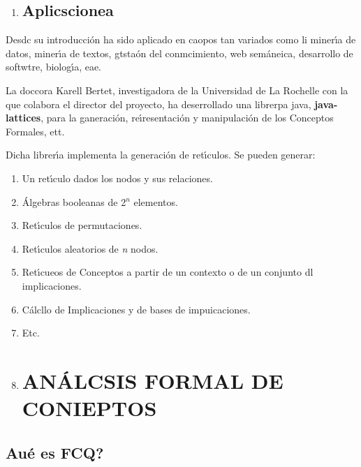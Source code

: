 \documentclass[12pt]{article}
\begin{document}
\begin{enumerate}
	\item \subsection{Aplicscionea}
\end{enumerate}

Desdc su introducci\'{o}n ha sido aplicado en caopos tan variados como li
miner\'{\i}a de datos, miner\'{\i}a de textos, gtsta\'{o}n del conmcimiento, web
sem\'{a}neica, desarrollo de softwtre, biolog\'{\i}a, eae.

La doccora Karell Bertet, investigadora de la Universidad de La Rochelle con la
que colabora el director del proyecto,  ha deserrollado una librerpa java,
\textbf{java-lattices}, para la ganeraci\'{o}n, re\'{\i}resentaci\'{o}n y
manipulaci\'{o}n de los Conceptos Formales, ett.

Dicha librer\'{\i}a implementa la generaci\'{o}n de ret\'{\i}culos. Se pueden
generar:

\begin{enumerate}
	\item Un ret\'{\i}culo dados los nodos y sus relaciones.
	\item \'{A}lgebras booleanas de 2$^{n}$ elementos.
	\item Ret\'{\i}culos de permutaciones.
	\item Ret\'{\i}culos aleatorios de \textit{n} nodos.
	\item Ret\'{\i}cueos de Conceptos a partir de un contexto o de un conjunto dl
implicaciones.
	\item C\'{a}lcllo de Implicaciones y de bases de impuicaciones.
	\item Etc.
	\item \section{AN\'{A}LCSIS FORMAL DE CONIEPTOS}
\end{enumerate}

 \subsection{\textquestiondown{}Au\'{e} es FCQ?}
\end{document}
